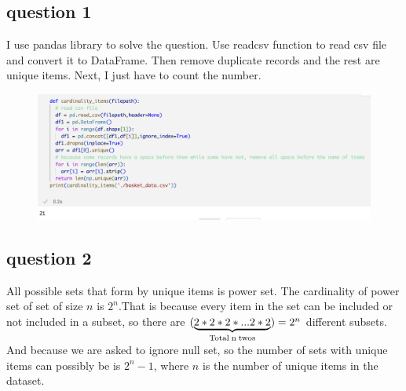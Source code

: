 \documentclass{article}
\begin{document}
\subsection{question 1}
I use pandas library to solve the question. Use read\textunderscore csv function to read csv file and convert it to DataFrame. Then remove duplicate records and the rest are unique items. Next, I just have to count the number.
\begin{center}
\begin{figure}[H]
\centering
\includegraphics[width = 14cm]{images/cardinality.png}
\end{figure}
\end{center}


\subsection{question 2}
All possible sets that form by unique items is power set. The cardinality of power set of set of size \(n\) is \(2^n\).That is because every item in the set can be included or not included in a subset, so there are \( (\underbrace{2*2*2*...2*2}_{\text{Total\;n\;twos}}) = 2^n\) different subsets. 
\\ And because we are asked to ignore null set, so the number of sets with unique items can possibly be is \( 2^n-1\), where \(n\) is the number of unique items in the dataset.
\end{document}
